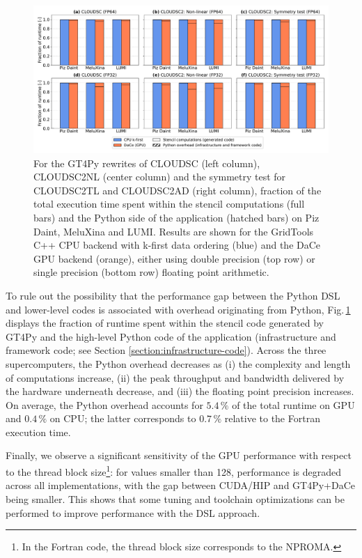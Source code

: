 \documentclass[gmd,manuscript,online]{copernicus}
\theoremstyle{theorem}
\theoremstyle{definition}
\theoremstyle{remark}
\theoremstyle{proposition}
\begin{document}
	\begin{figure}[t!]
		\centering
		\includegraphics[scale=0.44]{runtime_fraction_1.pdf}
		\caption{For the GT4Py rewrites of CLOUDSC (left column), CLOUDSC2NL (center column) and the symmetry test for CLOUDSC2TL and CLOUDSC2AD (right column), fraction of the total execution time spent within the stencil computations (full bars) and the Python side of the application (hatched bars) on Piz Daint, MeluXina and LUMI. Results are shown for the GridTools C++ CPU backend with k-first data ordering (blue) and the DaCe GPU backend (orange), either using double precision (top row) or single precision (bottom row) floating point arithmetic.}
		\label{fig:runtime-fraction}
	\end{figure}

	To rule out the possibility that the performance gap between the Python DSL and lower-level codes is associated with overhead originating from Python, Fig.\,\ref{fig:runtime-fraction} displays the fraction of runtime spent within the stencil code generated by GT4Py and the high-level Python code of the application (infrastructure and framework code; see Section \ref{section:infrastructure-code}). Across the three supercomputers, the Python overhead decreases as (i) the complexity and length of computations increase, (ii) the peak throughput and bandwidth delivered by the hardware underneath decrease, and (iii) the floating point precision increases. On average, the Python overhead accounts for $5.4\,\%$ of the total runtime on GPU and $0.4\,\%$ on CPU; the latter corresponds to $0.7\,\%$ relative to the Fortran execution time.

	Finally, we observe a significant sensitivity of the GPU performance with respect to the thread block size\footnote{In the Fortran code, the thread block size corresponds to the NPROMA.}: for values smaller than 128, performance is degraded across all implementations, with the gap between CUDA/HIP and GT4Py+DaCe being smaller. This shows that some tuning and toolchain optimizations can be performed to improve performance with the DSL approach.
\end{document}
